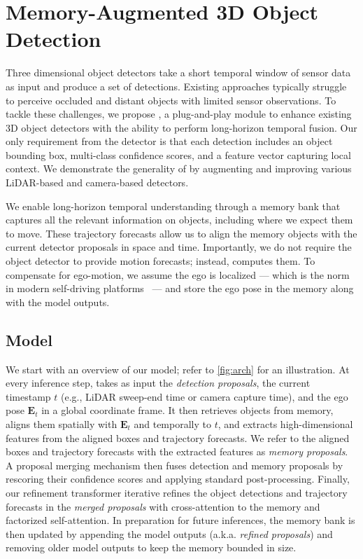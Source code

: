 \chapter{Memory-Augmented 3D Object Detection}
\label{sec:method}

Three dimensional object detectors take a short temporal window of sensor data as input and produce a set of detections.
Existing approaches typically struggle to perceive occluded and distant objects with limited sensor observations.
To tackle these challenges, we propose \ourmodel{}, a plug-and-play module to enhance existing 3D object detectors with the ability to perform long-horizon temporal fusion.
Our only requirement from the detector is that each detection includes an object bounding box, multi-class confidence scores,
and a feature vector capturing local context.
We demonstrate the generality of \ourmodel{} by augmenting and improving various LiDAR-based and camera-based detectors.

We enable long-horizon temporal understanding through a memory bank that captures all the relevant information on objects,
including where we expect them to move.
These trajectory forecasts allow us to align the memory objects with the current detector proposals in space and time.
Importantly, we do not require the object detector to provide motion forecasts; instead, \ourmodel{} computes them.
To compensate for ego-motion, we assume the ego is localized --- which is the norm in modern self-driving platforms~\cite{wilson2023argoverse,WOD} --- and store the ego pose in the memory along with the model outputs.

\section{Model}
\label{sec:method-arch}
We start with an overview of our model; refer to \cref{fig:arch} for an illustration.
At every inference step, \ourmodel{} takes as input the \textit{detection proposals}, the current timestamp $t$ (e.g., LiDAR sweep-end time or camera capture time),
and the ego pose $\mathbf{E}_{t}$ in a global coordinate frame.
It then retrieves objects from memory, aligns them spatially with $\mathbf{E}_t$ and temporally to $t$, and extracts high-dimensional features from the aligned boxes and trajectory forecasts.
We refer to the aligned boxes and trajectory forecasts
with the extracted features as \textit{memory proposals}.
A proposal merging mechanism then fuses detection and memory proposals by rescoring their confidence scores and applying standard post-processing.
Finally, our refinement transformer iterative refines the object detections and trajectory forecasts in the \textit{merged proposals} with cross-attention to the memory and factorized self-attention.
In preparation for future inferences, the memory bank is then updated by appending the model outputs (a.k.a. \textit{refined proposals}) and removing older model outputs to keep the memory bounded in size. 

